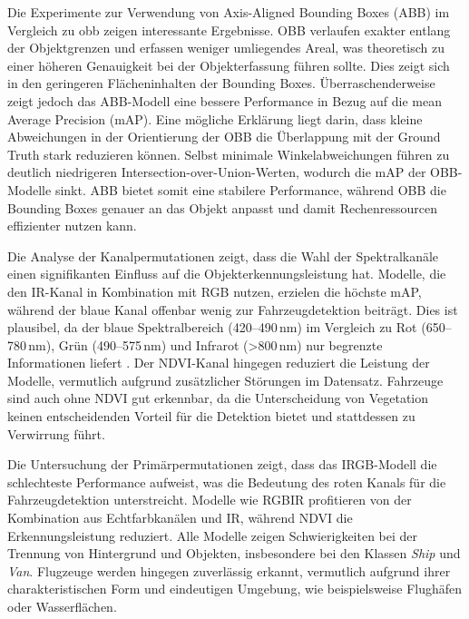 Die Experimente zur Verwendung von Axis-Aligned Bounding Boxes (ABB) im Vergleich zu \acrfull{obb} zeigen interessante Ergebnisse. OBB verlaufen exakter entlang der Objektgrenzen und erfassen weniger umliegendes Areal, was theoretisch zu einer höheren Genauigkeit bei der Objekterfassung führen sollte. Dies zeigt sich in den geringeren Flächeninhalten der Bounding Boxes. Überraschenderweise zeigt jedoch das ABB-Modell eine bessere Performance in Bezug auf die mean Average Precision (mAP). Eine mögliche Erklärung liegt darin, dass kleine Abweichungen in der Orientierung der OBB die Überlappung mit der Ground Truth stark reduzieren können. Selbst minimale Winkelabweichungen führen zu deutlich niedrigeren Intersection-over-Union-Werten, wodurch die mAP der OBB-Modelle sinkt. ABB bietet somit eine stabilere Performance, während OBB die Bounding Boxes genauer an das Objekt anpasst und damit Rechenressourcen effizienter nutzen kann. 

Die Analyse der Kanalpermutationen zeigt, dass die Wahl der Spektralkanäle einen signifikanten Einfluss auf die Objekterkennungsleistung hat. Modelle, die den IR-Kanal in Kombination mit RGB nutzen, erzielen die höchste mAP, während der blaue Kanal offenbar wenig zur Fahrzeugdetektion beiträgt. Dies ist plausibel, da der blaue Spektralbereich (420–490\,nm) im Vergleich zu Rot (650–780\,nm), Grün (490–575\,nm) und Infrarot (>800\,nm) nur begrenzte Informationen liefert . Der NDVI-Kanal hingegen reduziert die Leistung der Modelle, vermutlich aufgrund zusätzlicher Störungen im Datensatz. Fahrzeuge sind auch ohne NDVI gut erkennbar, da die Unterscheidung von Vegetation keinen entscheidenden Vorteil für die Detektion bietet und stattdessen zu Verwirrung führt. 

Die Untersuchung der Primärpermutationen zeigt, dass das IRGB-Modell die schlechteste Performance aufweist, was die Bedeutung des roten Kanals für die Fahrzeugdetektion unterstreicht. Modelle wie RGBIR profitieren von der Kombination aus Echtfarbkanälen und IR, während NDVI die Erkennungsleistung reduziert. Alle Modelle zeigen Schwierigkeiten bei der Trennung von Hintergrund und Objekten, insbesondere bei den Klassen \emph{Ship} und \emph{Van}. Flugzeuge werden hingegen zuverlässig erkannt, vermutlich aufgrund ihrer charakteristischen Form und eindeutigen Umgebung, wie beispielsweise Flughäfen oder Wasserflächen. 

